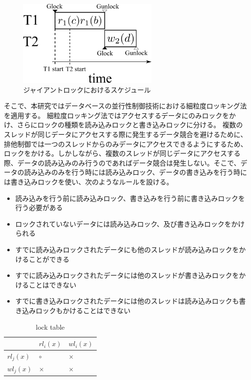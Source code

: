 \documentclass[a4paper]{jreport}	%
\begin{document}
\begin{figure}[h] 
\centering
\includegraphics[width=7cm]{g-lock-time.png}	
\caption{ジャイアントロックにおけるスケジュール}
\label{fig:g-lock-time}
\end{figure}

そこで、本研究ではデータベースの並行性制御技術における細粒度ロッキング法を適用する。
細粒度ロッキング法ではアクセスするデータにのみロックをかけ、さらにロックの種類を読み込みロックと書き込みロックに分ける。
複数のスレッドが同じデータにアクセスする際に発生するデータ競合を避けるために、排他制御では一つのスレッドからのみデータにアクセスできるようにするため、ロックをかける。しかしながら、複数のスレッドが同じデータにアクセスする際、データの読み込みのみ行うのであればデータ競合は発生しない。そこで、データの読み込みのみを行う時には読み込みロック、データの書き込みを行う時には書き込みロックを使い、次のようなルールを設ける。

\begin{itemize}
 \item 読み込みを行う前に読み込みロック、書き込みを行う前に書き込みロックを行う必要がある
 \item ロックされていないデータには読み込みロック、及び書き込みロックをかけられる
 \item すでに読み込みロックされたデータにも他のスレッドが読み込みロックをかけることができる
 \item すでに読み込みロックされたデータには他のスレッドが書き込みロックをかけることはできない
 \item すでに書き込みロックされたデータには他のスレッドは読み込みロックも書き込みロックもかけることはできない
\end{itemize}


\begin{table}[h!]
\centering
\begin{tabular}{ | m{1cm} | m{1cm} | m{1cm} | } 
  \hline
  & $rl_i(x)$ & $wl_i(x)$ \\ 
  \hline
  $rl_j(x)$ & $\circ$ & $\times$ \\ 
  \hline
  $wl_j(x)$ &  $\times$ & $\times$ \\ 
  \hline
\end{tabular}	
\caption{lock table}
\label{table:各ロックの互換性}
\end{table}
\end{document}
